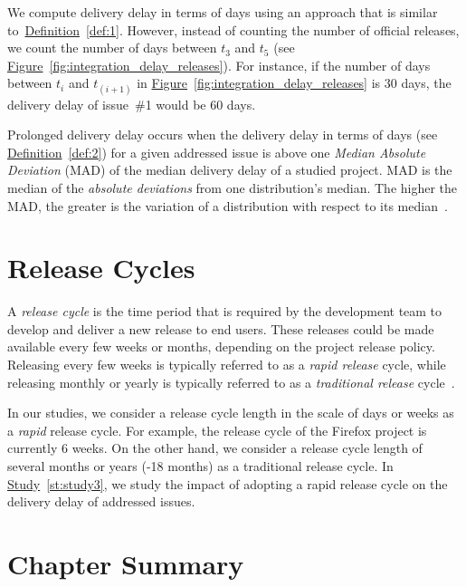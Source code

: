  We compute delivery delay in
terms of days using an approach that is similar
to~\hyperref[def:1]{Definition}~\ref{def:1}. However, instead of counting the
number of official releases, we count the number of days between {$t_3$} and
{$t_5$} (see
\hyperref[fig:integration_delay_releases]{Figure}~\ref{fig:integration_delay_releases}).
For instance, if the number of days between $t_i$ and $t_{(i+1)}$ in
\hyperref[fig:integration_delay_releases]{Figure}~\ref{fig:integration_delay_releases}
is 30 days, the delivery delay of issue~\#1 would be 60 days.

 Prolonged delivery delay occurs when the
delivery delay in terms of days (see \hyperref[def:2]{Definition}~\ref{def:2})
for a given addressed issue is above one {\em Median Absolute Deviation} (MAD)
of the median delivery delay of a studied project. MAD is the median of the
\textit{absolute deviations} from one distribution's median. The higher the MAD,
the greater is the variation of a distribution with respect to its
median~\cite{howell2005median,leys2013detecting}.

\section{Release Cycles} \label{subsec:firefox_releases}

A {\em release cycle} is the time period that is required by the development
team to develop and deliver a new release to end users. These releases could be
made available every few weeks or months, depending on the project release
policy. Releasing every few weeks is typically referred to as a \textit{rapid
release} cycle, while releasing monthly or yearly is typically referred to as a
\textit{traditional release} cycle~\cite{Mantyla2013}.

In our studies, we consider a release cycle length in the scale of days or weeks
as a {\em rapid} release cycle. For example, the release cycle of the Firefox
project is currently 6
weeks.
On the other hand, we consider a release cycle length of  several months or
years (-18 months) as a traditional release cycle. In
\hyperref[st:study3]{Study}~\ref{st:study3}, we study the impact of adopting a
rapid release cycle on the delivery delay of addressed issues.

\section{Chapter Summary}


